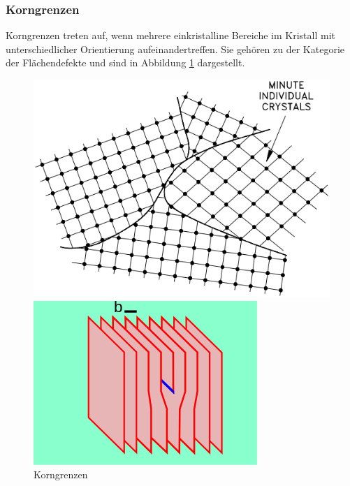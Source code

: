 \documentclass[12pt,a4paper]{scrartcl}
\numberwithin{equation}{section} %
\begin{document}
\hypertarget{korngrenzen}{
\subsubsection{Korngrenzen}\label{korngrenzen}}
Korngrenzen treten auf, wenn mehrere einkristalline Bereiche im Kristall mit unterschiedlicher Orientierung aufeinandertreffen. Sie gehören zu der Kategorie der Flächendefekte und sind in Abbildung \ref{abb:Korngrenzen} dargestellt. \cite{Gross} %

\begin{figure}[ht]
	\centering
	\begin{minipage}[t]{0.3\textwidth}
		\centering
		\includegraphics[width=\textwidth]{../media/B2.5/Korngrenzen.png}
		\caption{Korngrenzen \cite{USDoE}}
		\label{abb:Korngrenzen}
	\end{minipage}
	\begin{minipage}[t]{0.3\textwidth}
		\centering
		\includegraphics[width=\textwidth]{../media/B2.5/320px-Dislocation_edge_d2.svg.png}

\end{minipage}
\end{figure}
\end{document}

